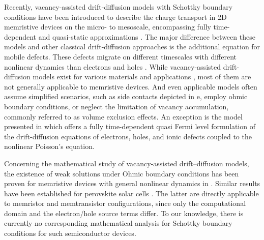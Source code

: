 \documentclass[10pt,a4paper, final]{article}
\theoremstyle{definition}								%
\numberwithin{equation}{section}
\numberwithin{figure}{section}
\numberwithin{theorem}{section}
\begin{document}
Recently, vacancy-assisted drift-diffusion models with Schottky boundary conditions have been introduced to describe the charge transport in 2D memristive devices on the micro- to mesoscale, encompassing fully time-dependent \cite{Spetzler.2024} and quasi-static approximations \cite{Sivan.2022}.
The major difference between these models and other classical drift-diffusion approaches \cite{Farrell.2017, Markowich.1990} is the additional equation for mobile defects.
These defects migrate on different timescales with different nonlinear dynamics than electrons and holes \cite{Abdel.2023}.
While vacancy-assisted drift-diffusion models exist for various materials and applications \cite{Strukov.2009, Marchewka.2016, Jourdana.2023, CuestaLopez.2024, Calado.2022, Aoki.2014, Cances.2023, Bataillon.2010}, most of them are not generally applicable to memristive devices.
And even applicable models often assume simplified scenarios, such as side contacts depicted in e, employ ohmic boundary conditions, or neglect the limitation of vacancy accumulation, commonly referred to as volume exclusion effects.
An exception is the model presented in \cite{Spetzler.2024} which offers a fully time-dependent quasi Fermi level formulation of the drift-diffusion equations of electrons, holes, and ionic defects coupled to the nonlinear Poisson's equation.

Concerning the mathematical study of vacancy-assisted drift–diffusion models, the existence of weak solutions under Ohmic boundary conditions has been proven for memristive devices with general nonlinear dynamics in \cite{Herda.2024}.
Similar results have been established for perovskite solar cells \cite{Abdel.2024b, glitzky2024uniqueness}.
The latter are directly applicable to memristor and memtransistor configurations, since only the computational domain and the electron/hole source terms differ.
To our knowledge, there is currently no corresponding mathematical analysis for Schottky boundary conditions for such semiconductor devices.
\end{document}
